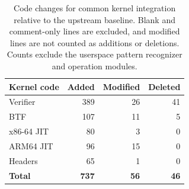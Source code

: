 \begin{table}[t]
\centering
\small
\caption{Code changes for common kernel integration relative to the upstream baseline. Blank and comment-only lines are excluded, and modified lines are not counted as additions or deletions. Counts exclude the userspace pattern recognizer and operation modules.}
\label{tab:kernel-loc}
\setlength{\tabcolsep}{2.5pt}
\renewcommand{\arraystretch}{1.1}
\begin{tabular*}{\columnwidth}{@{\extracolsep{\fill}}lrrr@{}}
\toprule
\textbf{Kernel code} & \textbf{Added} & \textbf{Modified} & \textbf{Deleted} \\
\midrule
Verifier & 389 & 26 & 41 \\
BTF & 107 & 11 & 5 \\
x86-64 JIT & 80 & 3 & 0 \\
ARM64 JIT & 96 & 15 & 0 \\
Headers & 65 & 1 & 0 \\
\midrule
\textbf{Total} & \textbf{737} & \textbf{56} & \textbf{46} \\
\bottomrule
\end{tabular*}
\end{table}
